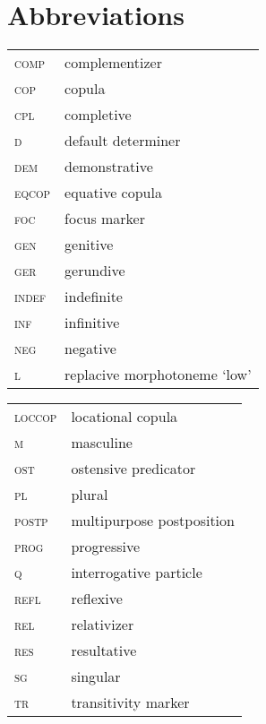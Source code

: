 \documentclass[output=paper]{langsci/langscibook}
\begin{document}
\section*{Abbreviations}
\begin{tabularx}{.55\textwidth}{@{}>{\scshape}lQ}
comp & complementizer\\
 cop & {copula}\\
 cpl & {completive}\\
 d & default determiner\\
 dem & {demonstrative}\\
 eqcop & {equative copula}\\
 foc & focus marker\\
 gen & genitive\\
 ger & gerundive\\
 indef & indefinite\\
 inf & {infinitive}\\
 neg & negative\\
 l & replacive morphotoneme ‘low’\\
\end{tabularx} 
\begin{tabularx}{.45\textwidth}{>{\scshape}lX@{}}
 loccop & locational {copula}\\
 m & masculine\\
 ost & {ostensive} {predicator}\\
 pl & plural\\
 postp & multipurpose postposition\\
 prog & progressive\\
 q & interrogative particle\\
 refl & reflexive\\
 rel & relativizer\\
 res & resultative\\
 sg & singular\\
 tr & {transitivity} marker\\
\end{tabularx} 
 
{\sloppy
\printbibliography[heading=subbibliography,notkeyword=this]
}
\end{document}
